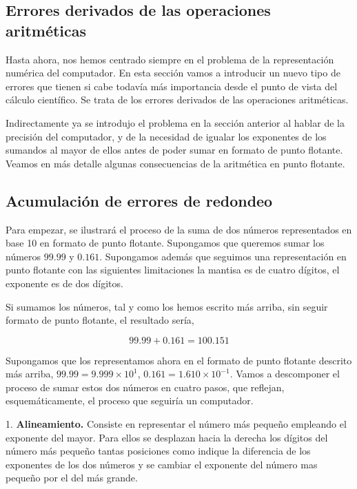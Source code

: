 \begin{paracol}{2}
\section{Errores derivados de las operaciones aritméticas}
Hasta ahora, nos hemos centrado siempre en el problema de la representación numérica del computador. En esta sección vamos a introducir un nuevo tipo de errores que tienen si cabe todavía más importancia desde el punto de vista del cálculo científico. Se trata de los errores derivados de las operaciones aritméticas.

Indirectamente ya se introdujo el problema en la sección anterior al hablar de la precisión del computador, y de la necesidad de igualar los exponentes de los sumandos al mayor de ellos antes de poder sumar en formato de punto flotante. Veamos en más detalle algunas consecuencias de la aritmética en punto flotante.
\subsection{Acumulación de errores de redondeo}

Para empezar, se ilustrará el proceso de la suma de dos números representados en base 10 en formato de punto flotante. Supongamos que queremos sumar los números $99.99$ y $0.161$. Supongamos además que seguimos una representación en punto flotante con las siguientes limitaciones la mantisa es de cuatro dígitos, el exponente es de dos dígitos.

Si sumamos los números, tal y como los hemos escrito más arriba, sin seguir formato de punto flotante, el resultado sería,
\end{paracol}
\begin{equation*}
99.99+0.161=100.151
\end{equation*}

\begin{paracol}{2}
Supongamos que los representamos ahora en el formato de punto flotante descrito más arriba, $99.99=9.999\times10^1$, $0.161=1.610\times10^{-1}$. Vamos a descomponer el proceso de sumar estos dos números en cuatro pasos, que reflejan, esquemáticamente, el proceso que seguiría un computador.

1. \textbf{Alineamiento.} Consiste en representar el número más pequeño empleando el exponente del mayor. Para ellos se desplazan hacia la derecha los dígitos del número más pequeño tantas posiciones como indique la diferencia de los exponentes de los dos números y se cambiar el exponente del número mas pequeño por el del más grande.
\end{paracol}

